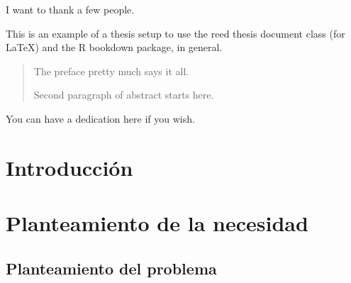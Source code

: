\documentclass[12pt,twoside]{reedthesis}
\title{}
\author{}
\date{}
\theoremstyle{definition}
\theoremstyle{definition}
\theoremstyle{definition}
\theoremstyle{remark}
\begin{document}

\frontmatter %
\pagestyle{empty} %
  \begin{acknowledgements}
    I want to thank a few people.
  \end{acknowledgements}
  \begin{preface}
    This is an example of a thesis setup to use the reed thesis document
    class (for LaTeX) and the R bookdown package, in general.
  \end{preface}
  \hypersetup{linkcolor=black}
  \setcounter{tocdepth}{2}
  \tableofcontents

  \listoftables

  \listoffigures
  \begin{abstract}
    The preface pretty much says it all.
    
    \par
    
    Second paragraph of abstract starts here.
  \end{abstract}
  \begin{dedication}
    You can have a dedication here if you wish.
  \end{dedication}
\mainmatter %
\pagestyle{fancyplain} %

\hypertarget{introduccion}{%
\chapter*{Introducción}\label{introduccion}}

\hypertarget{rmd-basics}{%
\chapter{Planteamiento de la necesidad}\label{rmd-basics}}

\hypertarget{planteamiento-del-problema}{%
\section{Planteamiento del problema}\label{planteamiento-del-problema}}
\end{document}
